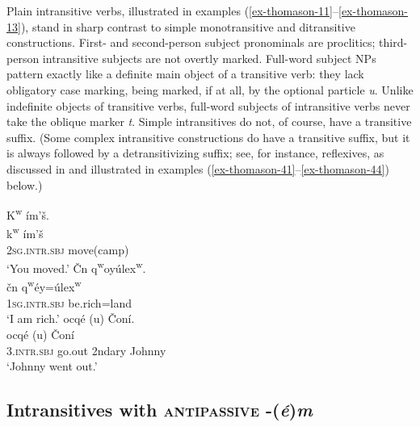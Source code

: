 \documentclass[output=paper,colorlinks,citecolor=brown]{langscibook}
\begin{document}
Plain intransitive verbs, illustrated in examples (\ref{ex-thomason-11}--\ref{ex-thomason-13}), stand in sharp
contrast to simple monotransitive and ditransitive constructions.
First- and second-per\-son subject pronominals are proclitics;
third-person intransitive subjects are not overtly marked.  Full-word
subject NPs pattern exactly like a definite main object of a
transitive verb: they lack obligatory case marking, being marked, if at
all, by the optional particle \emph{{\textltilde}u}.  Unlike indefinite
objects of transitive verbs, full-word subjects of intransitive verbs
never take the oblique marker \emph{t}.  Simple intransitives do not,
of course, have a transitive suffix.  (Some complex intransitive
constructions do have a transitive suffix, but it is always followed
by a detransitivizing suffix; see, for instance, reflexives, as
discussed in  and illustrated in examples 
(\ref{ex-thomason-41}--\ref{ex-thomason-44}) below.)\largerpage[-1]

\ea
\label{ex-thomason-11}
K\textsuperscript w \textglotstop\'im'\v{s}.  \\
\gll k\textsuperscript w \textglotstop\'im'\v{s}\\
\textsc{2sg}.\textsc{intr.sbj} move(camp)\\  
\glt `You moved.'
\ex 
\label{ex-thomason-12}
\v{C}n {q\textsuperscript w}oy\'ulex\textsuperscript w.  \\
\gll \v{c}n q\textsuperscript w\'ey=\'ulex\textsuperscript w\\
\textsc{1sg}.\textsc{intr.sbj} be.rich=land\\  
\glt `I am rich.'
\pagebreak
\ex 
\label{ex-thomason-13}
{\textglotstop}ocq\'e{\textglotstop} ({\textltilde}u)  \v{C}on\'i. \\
  {\textglotstop}ocq\'e \textglotstop ({\textltilde}u) \v{C}on\'i\\
3.\textsc{intr.sbj}  go.out 2ndary Johnny\\
 \glt `Johnny went out.'
 \z


\subsection{Intransitives with \textsc{antipassive} -(\emph{\'e})\emph{m}}  %
\label{thomason_section_2.4}
\end{document}
